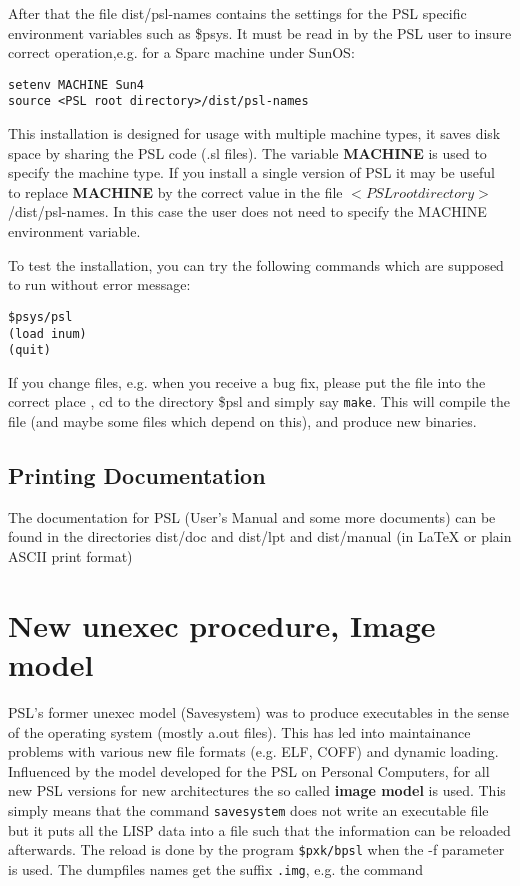 After that the file dist/psl-names contains the settings for the  
PSL specific environment variables such as \$psys. It must be
read in by the PSL user to insure correct operation,e.g. for a
Sparc machine under SunOS:

\begin{verbatim}
setenv MACHINE Sun4
source <PSL root directory>/dist/psl-names
\end{verbatim}

This installation is designed for usage with multiple machine types,
it saves disk space by sharing the PSL code (.sl files).
The variable  {\bf MACHINE} is used to specify the machine type.
If you install a single version of PSL it may be useful to
replace {\bf MACHINE} by the correct value in the file
$<PSL root directory>$/dist/psl-names. In this case the
user does not need to specify the MACHINE environment variable.

To test the installation, you can try the following commands which
are supposed to run without error message:

\begin{verbatim}   
$psys/psl
(load inum)
(quit)
\end{verbatim}   

If you change files, e.g. when you receive a bug fix, please 
put the file into the correct place , cd to the directory \$psl and
simply say {\tt make}. This will compile the file (and maybe some
files which depend on this), and produce new binaries.

\subsection{Printing Documentation}

The documentation for PSL (User's Manual and some more documents)
can be found in the directories 
dist/doc and dist/lpt and dist/manual (in {\LaTeX} or plain ASCII print format)

\section{New unexec procedure, Image model}

PSL's former unexec model (Savesystem) was to produce executables
in the sense of the operating system (mostly a.out files). 
This has led into maintainance 
problems with various new file formats (e.g. ELF, COFF) and dynamic
loading. Influenced by the model developed for the PSL on Personal
Computers, for all new PSL versions for new architectures the
so called {\bf image model} is used. This simply means that
the command {\tt savesystem} does not write an executable file but
it puts all the LISP data into a file such that the information
can be reloaded afterwards. The reload is done by the program
{\tt \$pxk/bpsl} when the -f parameter is used.
The dumpfiles names get the suffix {\tt .img}, e.g. the command

